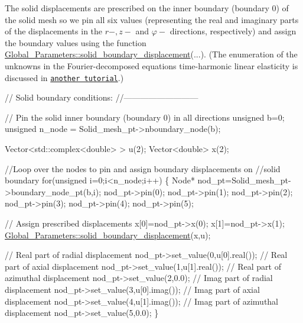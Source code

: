 The solid displacements are prescribed on the inner boundary (boundary 0) of the solid mesh so we pin all six values (representing the real and imaginary parts of the displacements in the $ r-, z- $ and $ \varphi- $ directions, respectively) and assign the boundary values using the function {\ttfamily \hyperlink{namespaceGlobal__Parameters_ab51fa55d06d9963d363bcf966cfcc62b}{Global\+\_\+\+Parameters\+::solid\+\_\+boundary\+\_\+displacement}}(...). (The enumeration of the unknowns in the Fourier-\/decomposed equations time-\/harmonic linear elasticity is discussed in \href{../../../time_harmonic_fourier_decomposed_linear_elasticity/cylinder/html/index.html#element_types}{\tt another tutorial}.)


\begin{DoxyCodeInclude}
 

 \textcolor{comment}{// Solid boundary conditions:}
 \textcolor{comment}{//---------------------------}

 \textcolor{comment}{// Pin the solid inner boundary (boundary 0) in all directions}
 \textcolor{keywordtype}{unsigned} b=0;
 \textcolor{keywordtype}{unsigned} n\_node = Solid\_mesh\_pt->nboundary\_node(b);
 
 Vector<std::complex<double> > u(2);
 Vector<double> x(2);

 \textcolor{comment}{//Loop over the nodes to pin and assign boundary displacements on }
 \textcolor{comment}{//solid boundary}
 \textcolor{keywordflow}{for}(\textcolor{keywordtype}{unsigned} i=0;i<n\_node;i++)
  \{
   Node* nod\_pt=Solid\_mesh\_pt->boundary\_node\_pt(b,i);
   nod\_pt->pin(0);
   nod\_pt->pin(1);
   nod\_pt->pin(2);
   nod\_pt->pin(3);
   nod\_pt->pin(4);
   nod\_pt->pin(5);

   \textcolor{comment}{// Assign prescribed displacements}
   x[0]=nod\_pt->x(0);
   x[1]=nod\_pt->x(1);
   \hyperlink{namespaceGlobal__Parameters_ab51fa55d06d9963d363bcf966cfcc62b}{Global\_Parameters::solid\_boundary\_displacement}(x,u);

   \textcolor{comment}{// Real part of radial displacement}
   nod\_pt->set\_value(0,u[0].real());
   \textcolor{comment}{// Real part of axial displacement}
   nod\_pt->set\_value(1,u[1].real());
   \textcolor{comment}{// Real part of azimuthal displacement}
   nod\_pt->set\_value(2,0.0);
   \textcolor{comment}{// Imag part of radial displacement}
   nod\_pt->set\_value(3,u[0].imag());
   \textcolor{comment}{// Imag part of axial displacement}
   nod\_pt->set\_value(4,u[1].imag());
   \textcolor{comment}{// Imag part of azimuthal displacement}
   nod\_pt->set\_value(5,0.0);
  \}

\end{DoxyCodeInclude}


